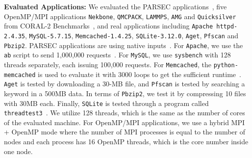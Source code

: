 \textbf{Evaluated Applications: }  We evaluated the PARSEC applications~\cite{parsec}, five OpenMP/MPI applications \texttt{Nekbone}, \texttt{QMCPACK}, \texttt{LAMMPS}, \texttt{AMG} and \texttt{Quicksilver} from CORAL-2 Benchmarks~\cite{coral2}, and real applications including \texttt{Apache httpd-2.4.35}, \texttt{MySQL-5.7.15}, \texttt{Memcached-1.4.25}, \texttt{SQLite-3.12.0}, \texttt{Aget}, \texttt{Pfscan} and \texttt{Pbzip2}. PARSEC applications are using native inputs~\cite{parsec}. For \texttt{Apache}, we use the \texttt{ab} script to send 1,000,000 requests~\cite{apachetest}. For \texttt{MySQL}, we use \texttt{sysbench} with 128 threads separately, each issuing 100,000 requests. For \texttt{Memcached}, the \texttt{python-memcached} is used to evaluate it with 3000 loops to get the sufficient runtime~\cite{memcached}. \texttt{Aget} is tested by downloading a 30-MB file, and \texttt{Pfscan} is tested by searching  a keyword in a 500MB data. In terms of \texttt{Pbzip2}, we test it by compressing 10 files with 30MB each. Finally, \texttt{SQLite} is tested through a program called \texttt{threadtest3}~\cite{sqlitetest}. We utilize 128 threads, which is the same as the number of cores of the evaluated machine. For OpenMP/MPI applications, we use a hybrid MPI + OpenMP mode where the number of MPI processes is equal to the number of nodes and each process has 16 OpenMP threads, which is the core number inside one node.






